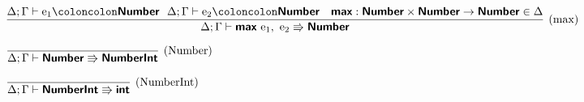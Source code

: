 \documentclass[a4paper]{article}
\newcommand{\kw}[1]{\textsf{\textbf{#1}}}
\newcommand{\colcol}{\coloncolon}
\newcommand{\yield}{\Rrightarrow}
\begin{document}
\vspace{3\baselineskip}

$\infer[\text{(max)}]%
{\Delta;\Gamma \vdash \kw{max}~\textrm{e}_\textrm{1},~\textrm{e}_\textrm{2} \yield \kw{Number}}%
{\Delta;\Gamma \vdash \textrm{e}_\textrm{1} \colcol \kw{Number}~~ \Delta;\Gamma \vdash\textrm{e}_\textrm{2} \colcol \kw{Number} & \kw{max}:\kw{Number}\times\kw{Number}\rightarrow\kw{Number}\in \Delta}$


\vspace{3\baselineskip}

$\infer[\text{(Number)}]%
{\Delta;\Gamma \vdash \kw{Number} \yield \kw{NumberInt}}%
{}$


\vspace{3\baselineskip}

$\infer[\text{(NumberInt)}]%
{\Delta;\Gamma \vdash \kw{NumberInt} \yield \kw{int}}%
{}$
\end{document}
